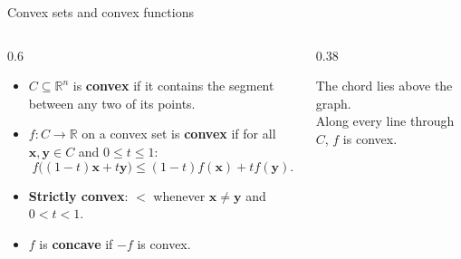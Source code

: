 \documentclass[10pt]{wosm-slides}
\newcommand{\R}{\mathbb{R}}
\newcommand{\vx}{\mathbf{x}}
\newcommand{\vy}{\mathbf{y}}
\begin{document}
\begin{frame}{Convex sets and convex functions}
  \begin{columns}[c]
    \begin{column}{0.6\textwidth}
      \begin{definition}
        \begin{itemize}
          \item $C \subseteq \R^n$ is \textbf{convex} if it contains the segment between any two
            of its points.
          \item $f\colon C \to \R$ on a convex set is \textbf{convex} if for all $\vx, \vy \in C$
            and $0 \le t \le 1$:
            \[ f\bigl((1 - t)\vx + t\vy\bigr) \le (1 - t) f(\vx) + t f(\vy) . \]
          \item \textbf{Strictly convex}: $<$ whenever $\vx \ne \vy$ and $0 < t < 1$.
          \item $f$ is \textbf{concave} if $-f$ is convex.
        \end{itemize}
      \end{definition}
    \end{column}
    \begin{column}{0.38\textwidth}
      \centering
      \par\small The chord lies above the graph. \\ Along every line through $C$, $f$ is convex.
    \end{column}
  \end{columns}
\end{frame}
\end{document}
